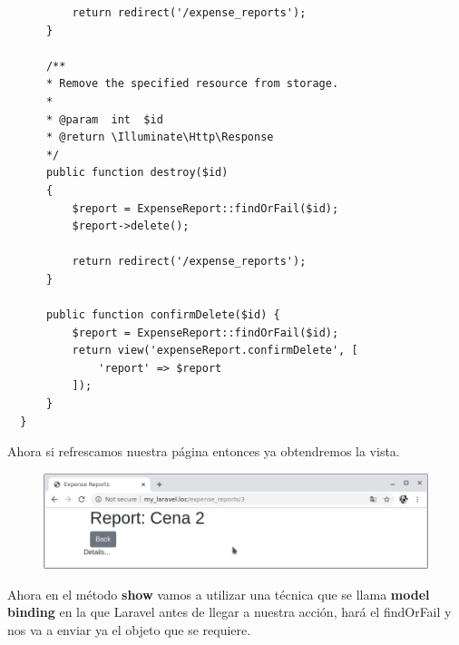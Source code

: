\documentclass{article}
\begin{document}
\begin{verbatim}
          return redirect('/expense_reports');
      }

      /**
      * Remove the specified resource from storage.
      *
      * @param  int  $id
      * @return \Illuminate\Http\Response
      */
      public function destroy($id)
      {
          $report = ExpenseReport::findOrFail($id);
          $report->delete();

          return redirect('/expense_reports');
      }

      public function confirmDelete($id) {
          $report = ExpenseReport::findOrFail($id);
          return view('expenseReport.confirmDelete', [
              'report' => $report
          ]);
      }
  }
\end{verbatim}

Ahora si refrescamos nuestra página entonces ya obtendremos la vista.

\begin{figure}[h!]
  \centering
  \includegraphics[scale=0.5]{./Pictures/097_expense_report_id.png}
\end{figure}

Ahora en el método \textbf{show} vamos a utilizar una técnica que se llama
\textbf{model binding} en la que Laravel antes de llegar a nuestra acción, hará
el findOrFail y nos va a enviar ya el objeto que se requiere.\\
\end{document}
